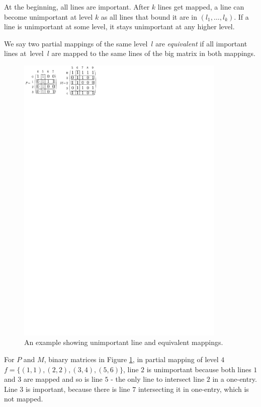 At the beginning, all lines are important. After $k$ lines get mapped, a line can become unimportant at level $k$ as all lines that bound it are in $(l_1,\dots,l_k)$. If a line is unimportant at some level, it stays unimportant at any higher level.
\begin{defn}
We say two partial mappings of the same level~$l$ are \emph{equivalent} if all important lines at~level~$l$ are mapped to the same lines of the big matrix in both mappings.
\end{defn}
\begin{figure}[h!]
\centering
\includegraphics[width=100mm]{../img/equivalent.pdf}
\caption{An example showing unimportant line and equivalent mappings.}
\label{equivalent}
\end{figure}
For $P$ and $M$, binary matrices in Figure \ref{equivalent}, in partial mapping of level $4$ $f=\{(1,1),(2,2),(3,4),(5,6)\}$, line $2$ is unimportant because both lines $1$ and $3$ are mapped and so is line $5$ - the only line to intersect line $2$ in a one-entry. Line $3$ is important, because there is line $7$ intersecting it in one-entry, which is not mapped.

